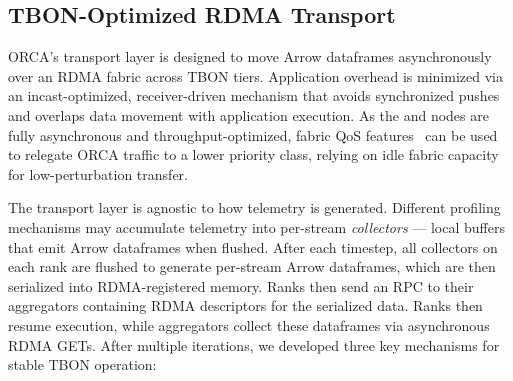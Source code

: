 

\subsection{TBON-Optimized RDMA Transport}
\label{sec:orca:des_xport}


ORCA's transport layer is designed to move Arrow dataframes asynchronously over an RDMA fabric across
TBON tiers.
Application overhead is minimized via an incast-optimized, receiver-driven mechanism that avoids synchronized
pushes and overlaps data movement with application execution.
As the \tierctl{} and \tieragg{} nodes are fully asynchronous and throughput-optimized, fabric QoS
features~\cite{DeSe2020:Slingshot} can be used to relegate ORCA traffic to a lower priority class,
relying on idle fabric capacity for low-perturbation transfer.

The transport layer is agnostic to how telemetry is generated.
Different profiling mechanisms may accumulate telemetry into per-stream \emph{collectors} --- local
buffers that emit Arrow dataframes when flushed.
After each timestep, all collectors on each rank are flushed to generate per-stream Arrow
dataframes, which are then serialized into RDMA-registered memory.
Ranks then send an RPC to their aggregators containing RDMA descriptors for the serialized
data.
Ranks then resume execution, while aggregators collect these dataframes via asynchronous RDMA GETs.
After multiple iterations, we developed three key mechanisms for stable TBON operation:

